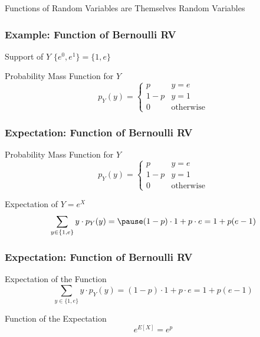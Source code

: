 \documentclass[handout]{beamer}
\begin{document}
\begin{frame}
\begin{center}
\Huge Functions of Random Variables are Themselves Random Variables
\end{center}

\end{frame}

\begin{frame}
\frametitle{Example: Function of Bernoulli RV}
\vspace{2em}

\begin{block}{Support of $Y$} \pause
$\{e^0, e^1\} =\{1, e\}$
\end{block}

\begin{block}{Probability Mass Function for $Y$} \pause
	$$p_Y(y) = \left\{\begin{array}{ll}p& y =e\\ 1-p& y = 1\\ 0& \mbox{otherwise}\end{array}\right.$$
\end{block}

\end{frame}
\begin{frame}
\frametitle{Expectation: Function of Bernoulli RV}
\vspace{2em}

\begin{block}{Probability Mass Function for $Y$} 
	$$p_Y(y) = \left\{\begin{array}{ll}p& y =e\\ 1-p& y = 1\\ 0& \mbox{otherwise}\end{array}\right.$$
\end{block}

\begin{block}{Expectation of $Y = e^X$}\pause
$$\sum_{y \in \{1, e\}} y \cdot p_Y(y) =\pause (1-p) \cdot 1 + p \cdot e = 1 + p(e - 1)$$
\end{block}




\end{frame}
\begin{frame}
\frametitle{Expectation: Function of Bernoulli RV}
\vspace{2em}



\begin{block}{Expectation of the Function}
$$\sum_{y \in \{1, e\}} y \cdot p_Y(y) = (1-p) \cdot 1 + p \cdot e = 1 + p(e - 1)$$
\end{block}

\begin{block}{Function of the Expectation}
$$e^{E[X]} = e^p $$
\end{block}



\end{frame}
\end{document}
